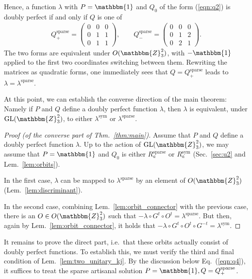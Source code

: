 \documentclass[aps,nofootinbib,floatfix,a4paper]{revtex4}
\newcommand{\sym}{^\mathrm{sym}}
\newcommand{\sparse}{^\mathrm{sparse}}
\newcommand{\1}{\mbox{$\mathbf{1}$}}
\def\ZZ{\mathbbm{Z}}
\def\Id{\mathbbm{1}}
\DeclareMathOperator{\GL}{GL}
\begin{document}
Hence, a function $\lambda$ with $P=\Id$ and $Q_0$ 
of the form (\ref{eqn:q2}) is doubly perfect if and only if $Q$ is one of
\begin{align}\label{eqn:q4}
	Q\sparse_+=
	\begin{pmatrix}
		0 & 0 & 0 \\
		0 & 1 & 1 \\
		0 & 1 & 1
	\end{pmatrix},
	\qquad
	Q\sparse_-=
	\begin{pmatrix}
		0 & 0 & 0 \\
		0 & 1 & 2 \\
		0 & 2 & 1
	\end{pmatrix}
	.
\end{align}
The two forms are equivalent under $O(\ZZ_3^2)$, with $-\Id$ applied to the first two coordinates switching between them.
Rewriting the matrices as quadratic forms, one immediately sees that $Q=Q\sparse_+$ leads to $\lambda=\lambda\sparse$.


At this point, we can establish the converse direction of the main theorem:
Namely if $P$ and $Q$ define a doubly perfect function $\lambda$, then $\lambda$ is equivalent, under $\GL(\ZZ_3^2)$, to either $\lambda\sym$ or $\lambda\sparse$.

\begin{proof}[Proof (of the converse part of Thm.~\ref{thm:main})]
	Assume that $P$ and $Q$ define a doubly perfect function $\lambda$. 
	Up to the action of $\GL(\ZZ_3^2)$, we may assume that $P=\Id$ and $Q_0$ is either $R\sparse_a$ or $R\sym_a$ (Sec.~\ref{sec:u2} and Lem.~\ref{lem:orbits}).

	In the first case, 
	$\lambda$ can be mapped to $\lambda\sparse$ by an element of $O(\ZZ_3^2)$ (Lem.~\ref{lem:discriminant}).

	In the second case, 
	combining Lem.~\ref{lem:orbit_connector} with the previous case, 
	there is an $O\in O(\ZZ_3^2)$ such that
	$-\lambda\circ G^t \circ O^t =\lambda\sparse$.
	But then, again by Lem.~\ref{lem:orbit_connector},
	it holds that
	$-\lambda\circ G^t \circ O^t \circ G^{-t} =\lambda\sym$.
\end{proof}


It remains to prove the direct part, i.e.\ that these orbits actually consist of doubly perfect functions.
To establish this, we must verify the third and final condition of Lem.~\ref{lem:two_unitary_kj}.
By the discussion below Eq.~(\ref{eqn:q4}), it suffices to treat the sparse artisanal solution $P=\Id, Q=Q\sparse_+$.
\end{document}

